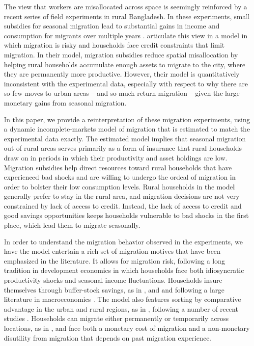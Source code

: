 \documentclass[12pt,pdftex]{article}
\begin{document}
The view that workers are misallocated across space is seemingly reinforced by a recent series of field experiments in rural Bangladesh. In these experiments, small subsidies for seasonal migration lead to substantial gains in income and consumption for migrants over multiple years \citep{brch14,akch17}. \citet{brch14} articulate this view in a model in which migration is risky and households face credit constraints that limit migration. In their model, migration subsidies reduce spatial misallocation by helping rural households accumulate enough assets to migrate to the city, where they are permanently more productive. However, their model is quantitatively inconsistent with the experimental data, especially with respect to why there are so few moves to urban areas -- and so much return migration -- given the large monetary gains from seasonal migration.

In this paper, we provide a reinterpretation of these migration experiments, using a dynamic incomplete-markets model of migration that is estimated to match the experimental data exactly. The estimated model implies that seasonal migration out of rural areas serves primarily as a form of insurance that rural households draw on in periods in which their productivity and asset holdings are low. Migration subsidies help direct resources toward rural households that have experienced bad shocks and are willing to undergo the ordeal of migration in order to bolster their low consumption levels. Rural households in the model generally prefer to stay in the rural area, and migration decisions are not very constrained by lack of access to credit. Instead, the lack of access to credit and good savings opportunities keeps households vulnerable to bad shocks in the first place, which lead them to migrate seasonally.

In order to understand the migration behavior observed in the experiments, we have the model entertain a rich set of migration motives that have been emphasized in the literature. It allows for migration risk, following a long tradition in development economics \citep[e.g.,][]{hato70} in which households face both idiosyncratic productivity shocks and seasonal income fluctuations. Households insure themselves through buffer-stock savings, as in \citet{bewl77}, \citet{aiya94} and \citet{huggett1993risk} and following a large literature in macroeconomics \citep[see, e.g.,][]{hest09,kavi10}. The model also features sorting by comparative advantage in the urban and rural regions, as in \citet{roy51}, following a number of recent studies \citep[including][]{lagakos2013selection,young2013inequality,hesc18,hikl17}. Households can migrate either permanently or temporarily across locations, as in \citet{kewa11}, and face both a monetary cost of migration and a non-monetary disutility from migration that depends on past migration experience.
\end{document}
